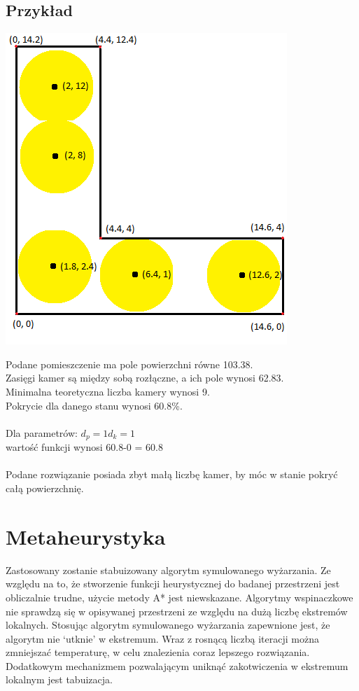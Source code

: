 \documentclass[12pt,a4paper]{article}
\begin{document}
\subsection{Przykład}
\begin{center}
\includegraphics[scale=0.9]{example_projection.png}
\end{center}
Podane pomieszczenie ma pole powierzchni równe 103.38. \\
Zasięgi kamer są między sobą rozłączne, a ich pole wynosi 62.83. \\
Minimalna teoretyczna liczba kamery wynosi 9. \\
Pokrycie dla danego stanu wynosi 60.8\%. \\ \\
Dla parametrów:
$d_p = 1 d_k = 1$ \\
wartość funkcji wynosi 60.8-0 = 60.8 \\ \\
Podane rozwiązanie posiada zbyt małą liczbę kamer,
by móc w stanie pokryć całą powierzchnię.
\section{Metaheurystyka}
Zastosowany zostanie stabuizowany algorytm symulowanego wyżarzania.
Ze względu na to, że stworzenie funkcji heurystycznej do badanej
przestrzeni jest obliczalnie trudne, użycie metody A* jest niewskazane.
Algorytmy wspinaczkowe nie sprawdzą się w opisywanej przestrzeni ze względu
na dużą liczbę ekstremów lokalnych.
Stosując algorytm symulowanego wyżarzania zapewnione jest,
że algorytm nie ‘utknie’ w ekstremum. Wraz z rosnącą liczbą iteracji można
zmniejszać temperaturę, w celu znalezienia coraz lepszego rozwiązania.
Dodatkowym mechanizmem pozwalającym uniknąć
zakotwiczenia w ekstremum lokalnym jest tabuizacja.\\
\end{document}
